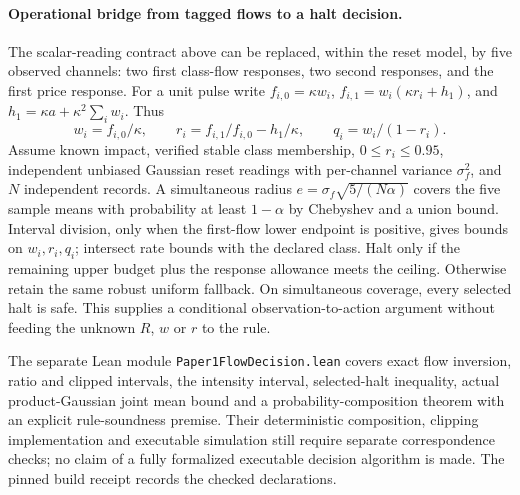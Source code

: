\documentclass[12pt]{article}
\theoremstyle{definition}
\theoremstyle{remark}
\begin{document}
\paragraph{Operational bridge from tagged flows to a halt decision.}
The scalar-reading contract above can be replaced, within the reset model, by five observed channels: two first class-flow responses, two second responses, and the first price response. For a unit pulse write $f_{i,0}=\kappa w_i$, $f_{i,1}=w_i(\kappa r_i+h_1)$, and $h_1=\kappa a+\kappa^2\sum_iw_i$. Thus
\[
 w_i=f_{i,0}/\kappa,\qquad r_i=f_{i,1}/f_{i,0}-h_1/\kappa,\qquad q_i=w_i/(1-r_i).
\]
Assume known impact, verified stable class membership, $0\le r_i\le0.95$, independent unbiased Gaussian reset readings with per-channel variance $\sigma_f^2$, and $N$ independent records. A simultaneous radius $e=\sigma_f\sqrt{5/(N\alpha)}$ covers the five sample means with probability at least $1-\alpha$ by Chebyshev and a union bound. Interval division, only when the first-flow lower endpoint is positive, gives bounds on $w_i,r_i,q_i$; intersect rate bounds with the declared class. Halt only if the remaining upper budget plus the response allowance meets the ceiling. Otherwise retain the same robust uniform fallback. On simultaneous coverage, every selected halt is safe. This supplies a conditional observation-to-action argument without feeding the unknown $R$, $w$ or $r$ to the rule.

The separate Lean module \nolinkurl{Paper1FlowDecision.lean} covers exact flow inversion, ratio and clipped intervals, the intensity interval, selected-halt inequality, actual product-Gaussian joint mean bound and a probability-composition theorem with an explicit rule-soundness premise. Their deterministic composition, clipping implementation and executable simulation still require separate correspondence checks; no claim of a fully formalized executable decision algorithm is made. The pinned build receipt records the checked declarations.
\end{document}
